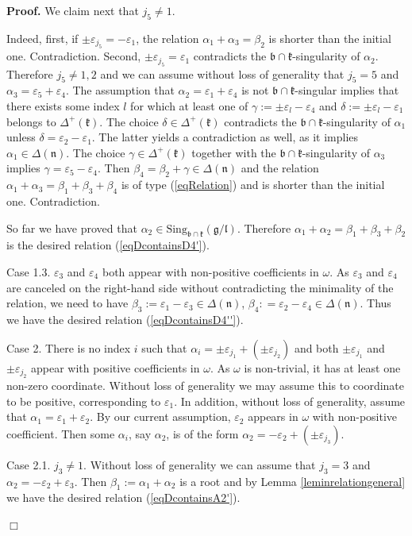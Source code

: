 \documentclass[12pt]{report}
\newenvironment{proof}[1][]{ \textbf{Proof#1. }}{$\Box$\medskip}
\newcommand{\kk}{\mathfrak{k}}
\newcommand{\nn}{\mathfrak{n}}
\newcommand{\gG}{\mathfrak{g}}
\newcommand{\bb}{\mathfrak{b}}
\newcommand{\lL}{\mathfrak{l}}
\newcommand{\refle}[1]{Lemma \ref{#1}}
\newcommand{\refeq}[1]{(\ref{#1})}
\newcommand{\hw}{\mathrm{Sing}}
\newcommand{\eps}{\varepsilon}
\newcommand{\pmf}[1]{ \pm}%
\begin{document}
\begin{proof}
We claim next that  $j_5\neq 1$. 

Indeed, first, if $\pmf{j_5}\eps_{j_5} =-\eps_{1}$, the relation $\alpha_1+\alpha_3=\beta_2$ is shorter than the initial one. Contradiction. Second, $\pmf{j_5}\eps_{j_5} =\eps_{1}$ contradicts the $\bb\cap\kk$-singularity of $\alpha_2$. Therefore $j_5\neq 1,2$ and we can assume without loss of generality that $j_5=5$ and $\alpha_3 =\eps_5 +\eps_4$. The assumption that $\alpha_2=\eps_{ 1}+\eps_{4}$ is not $\bb\cap\kk$-singular implies that there exists some index $l$ for which at least one of $\gamma:=\pmf{l}\eps_{l} -\eps_{4 }$ and $\delta:= \pmf{l} \eps_{l} - \eps_{1}$ belongs to $\Delta^+(\kk)$. The choice $\delta\in\Delta^+(\kk)$ contradicts the $\bb \cap \kk$-singularity of $\alpha_1$ unless $\delta=\eps_{2}-\eps_{1}$. The latter yields a contradiction as well, as it implies $\alpha_1 \in \Delta( \nn)$. The choice $\gamma \in \Delta^+(\kk)$ together with the $\bb \cap \kk$-singularity of $\alpha_3$ implies $\gamma= \eps_{5} -\eps_{ 4}$. Then $\beta_4 = \beta_2 +\gamma\in\Delta(\nn)$ and the relation $\alpha_1+ \alpha_3 = \beta_1+\beta_3+\beta_4$ is of type (\ref{eqRelation}) and is shorter than the initial one. Contradiction.

So far we have proved that $\alpha_2\in\hw_{\bb\cap\kk}(\gG/\lL)$. Therefore $\alpha_1+\alpha_2=\beta_1+\beta_3+\beta_2$ is the desired relation \refeq{eqDcontainsD4'}.

\noindent Case 1.3.  $\eps_{3}$ and $\eps_{4}$ both appear with non-positive coefficients in $\omega$. As $\eps_{3}$ and $\eps_{4}$ are canceled on the right-hand side without contradicting the minimality of the relation, we need to have $\beta_3:=\eps_{1}-\eps_{3}\in\Delta(\nn)$, $\beta_4: =\eps_{2}-\eps_{4}\in\Delta(\nn)$. Thus we have the desired relation \refeq{eqDcontainsD4''}.

\noindent Case 2. There is no index $i$ such that $\alpha_i=\pmf{j_1}\eps_{j_1}+(\pmf{j_2}\eps_{j_2})$ and both $\pmf{j_1} \eps_{j_1}$ and $\pmf{j_2} \eps_{j_2}$ appear with positive coefficients in $\omega$. As $\omega$ is non-trivial, it has at least one non-zero coordinate. Without loss of generality we may assume this to coordinate to be positive, corresponding to $\eps_1$. In addition, without loss of generality, assume that $\alpha_1 =\eps_{1} +\eps_{2}$. By our current assumption, $\eps_{2}$ appears in $\omega$ with non-positive coefficient. Then some $\alpha_i$, say $\alpha_2$, is of the form $\alpha_2 =-\eps_{2} +(\pmf{j_3} \eps_{j_3}) $. 

\noindent Case 2.1. $j_3\neq 1$. Without loss of generality we can assume that $j_3=3$ and $\alpha_2=-\eps_2+\eps_3$. Then $\beta_1:=\alpha_1+\alpha_2$ is a root and by \refle{leminrelationgeneral} we have the desired relation \refeq{eqDcontainsA2'}.


\end{proof}
\end{document}
